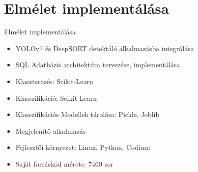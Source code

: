 \documentclass{beamer}
\begin{document}
\section{Elmélet implementálása}
\begin{frame}{Elmélet implementálása}
    \begin{itemize}
        \item YOLOv7 és DeepSORT detektáló alkalmazásba integrálása
        \item SQL Adatbázis architektúra tervezése, implementálása
        \item Klaszterezés: Scikit-Learn
        \item Klasszifikáció: Scikit-Learn
        \item Klasszifikációs Modellek tárolása: Pickle, Joblib
        \item Megjelenítő alkalmazás
        \item Fejlesztői környezet: Linux, Python, Codium
        \item Saját forráskód mérete: 7460 sor
    \end{itemize}
\end{frame}
\end{document}
